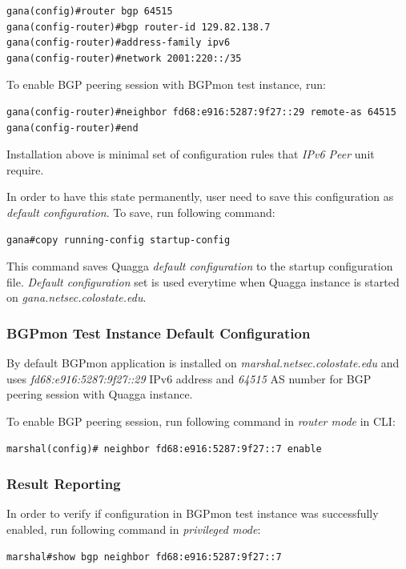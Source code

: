 \begin{verbatim}
gana(config)#router bgp 64515
gana(config-router)#bgp router-id 129.82.138.7
gana(config-router)#address-family ipv6
gana(config-router)#network 2001:220::/35
\end{verbatim}


To enable BGP peering session with BGPmon test instance, run:

\begin{verbatim}
gana(config-router)#neighbor fd68:e916:5287:9f27::29 remote-as 64515
gana(config-router)#end
\end{verbatim}

Installation above is  minimal set of configuration rules that \emph{IPv6 Peer} unit require.

In order to have this state permanently,  user need to save this configuration as  \emph{default configuration}.  To save, run following command:

\begin{verbatim}
gana#copy running-config startup-config
\end{verbatim}

This command saves Quagga \emph{default configuration} to the startup configuration file. \emph{Default configuration} set is used everytime when Quagga instance is started on \emph{gana.netsec.colostate.edu}.


\subsubsection{BGPmon Test Instance Default Configuration}
\label{sec:ipv6bgpmondef}

By default BGPmon application is installed on \emph{marshal.netsec.colostate.edu} and uses \emph{fd68:e916:5287:9f27::29} IPv6 address and \emph{64515} AS number for BGP peering session with Quagga instance. 

To enable BGP peering session, run following command in \emph{router mode} in CLI:
\begin{verbatim}
marshal(config)# neighbor fd68:e916:5287:9f27::7 enable
\end{verbatim}




\subsubsection{Result Reporting}

In order to verify if configuration in BGPmon test instance was successfully enabled, run following command in \emph{privileged mode}:
\begin{verbatim}
marshal#show bgp neighbor fd68:e916:5287:9f27::7
\end{verbatim}

